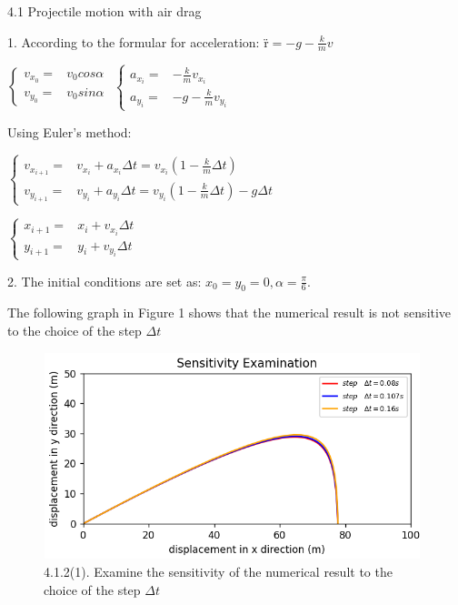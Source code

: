 \documentclass{book}
\begin{document}
{\huge 4.1 Projectile motion with air drag}

{\Large 1.}
\vspace{0.01\textheight}
According to the formular for acceleration:
{\"r}$=-g-\frac{k}{m}v$

$\begin{cases}
    v_{x_{0}}= & v_{0}cos\alpha \\

    v_{y_{0}}= & v_{0}sin\alpha
  \end{cases}$
\quad $
  \begin{cases}
    a_{x_{i}}= & -\frac{k}{m}v_{x_{i}}   \\

    a_{y_{i}}= & -g-\frac{k}{m}v_{y_{i}}
  \end{cases}
$

\vspace{0.01\textheight}
Using Euler's method:
\vspace{0.01\textheight}

\quad $
  \begin{cases}
    v_{x_{i+1}}= & v_{x_{i}}+a_{x_{i}}\Delta t = v_{x_{i}}(1-\frac{k}{m}\Delta t)           \\

    v_{y_{i+1}}= & v_{y_{i}}+a_{y_{i}}\Delta t = v_{y_{i}}(1-\frac{k}{m}\Delta t)-g\Delta t
  \end{cases}
$

\vspace{0.01\textheight}

\quad $
  \begin{cases}
    x_{i+1}= & x_{i}+v_{x_{i}}\Delta t \\

    y_{i+1}= & y_{i}+v_{y_{i}}\Delta t
  \end{cases}
$

\vspace{0.01\textheight}
{\Large 2.}
The initial conditions are set as: $x_{0}=y_{0}=0, \alpha =\frac{\pi}{6}$.

The following graph in Figure 1 shows that the numerical result is not sensitive to the choice of the step {$\Delta t$}

\begin{figure}[H]
  \centering
  \includegraphics[width=11cm,height=6cm]{./graphs/project4.1.2(4).png}
  \caption{4.1.2(1). Examine the sensitivity of the numerical result to the choice of the step $\Delta t$}
\end{figure}
\end{document}
